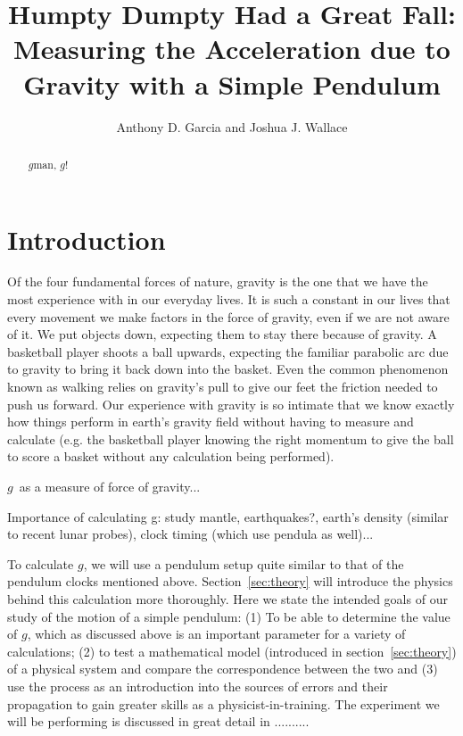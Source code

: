 \documentclass[iop,numberedappendix,appendixfloats]{emulateapj}
\def\g{$g$}
\begin{document}
\title{Humpty Dumpty Had a Great Fall: Measuring the Acceleration due to Gravity with a Simple Pendulum}

\author{ Anthony D. Garcia
and
Joshua J. Wallace}

\begin{abstract}

\g man, \g!

\end{abstract}

\section{Introduction}

Of the four fundamental forces of nature, gravity is the one that we have the 
most experience with in our everyday lives.  It is such a constant in our lives 
that every movement we make factors in the force of gravity, even if we are not
aware of it. We put objects down, expecting them to stay there because of 
gravity. A basketball player shoots a ball upwards, expecting the familiar 
parabolic arc due to gravity to bring it back down into the basket.  Even the
common phenomenon known as walking relies on gravity's pull to give our feet
the friction needed to push us forward. Our experience with gravity is so
intimate that we know exactly how things perform in earth's gravity field 
without having to measure and calculate (e.g. the basketball player knowing the 
right momentum to give the ball to score a basket without any calculation being
performed).

\g\ as a measure of force of gravity...

Importance of calculating g:  study mantle, earthquakes?, earth's density 
(similar to recent lunar probes), clock timing (which use pendula as well)...

To calculate \g, we will use a pendulum setup quite similar to that of the
pendulum clocks mentioned above.  Section~\ref{sec:theory} will introduce the 
physics behind this calculation more thoroughly.  Here we state the intended 
goals of our study of the motion of a simple pendulum:  (1) To be able to 
determine the value of \g, which as discussed above is an important parameter
for a variety of calculations; (2) to test a mathematical model (introduced in 
section~\ref{sec:theory}) of a physical system and compare the correspondence 
between the two and (3) use the process as an introduction into the sources of 
errors and their propagation to gain greater skills as a physicist-in-training. 
The experiment we will be performing is discussed in great detail in .......... 
\end{document}
